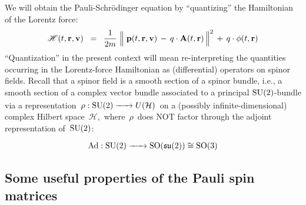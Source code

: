 We will obtain the Pauli-Schr\"odinger equation by ``quantizing''
the Hamiltonian of the Lorentz force:
\begin{equation*}
\mathscr{H}(t, \mathbf{r}, \mathbf{v})
\;\; = \;\;
    \dfrac{1}{2m}\,\left\Vert\;
        \mathbf{p}(t,\mathbf{r},\mathbf{v})
        \, \overset{{\color{white}.}}{-} \,
        q\cdot\mathbf{A}(t,\mathbf{r})
        \,\right\Vert^{2}
    \, + \,
    q\cdot\phi(t,\mathbf{r})
\end{equation*}
``Quantization'' in the present context will mean
re-interpreting the quantities occurring in the
Lorentz-force Hamiltonian as (differential) operators
on spinor fields.
Recall that a spinor field is a smooth section of a spinor bundle,
i.e., a smooth section of a complex vector bundle associated
to a principal $\textnormal{SU}(2)$-bundle via a representation
\,$\rho : \SU(2) \xrightarrow{{\color{white}????}} U(\mathcal{H})$\,
on a (possibly infinite-dimensional) complex Hilbert space \,$\mathcal{H}$,\,
where \,$\rho$\, does NOT factor through the adjoint representation of \,$\textnormal{SU}(2)$:\,
\begin{equation*}
\Ad : \SU(2) \xrightarrow{{\color{white}2222}} \SO(\mathfrak{su}(2)) \cong \SO(3)
\end{equation*}


\vskip 0.5cm
\subsection{Some useful properties of the Pauli spin matrices}

